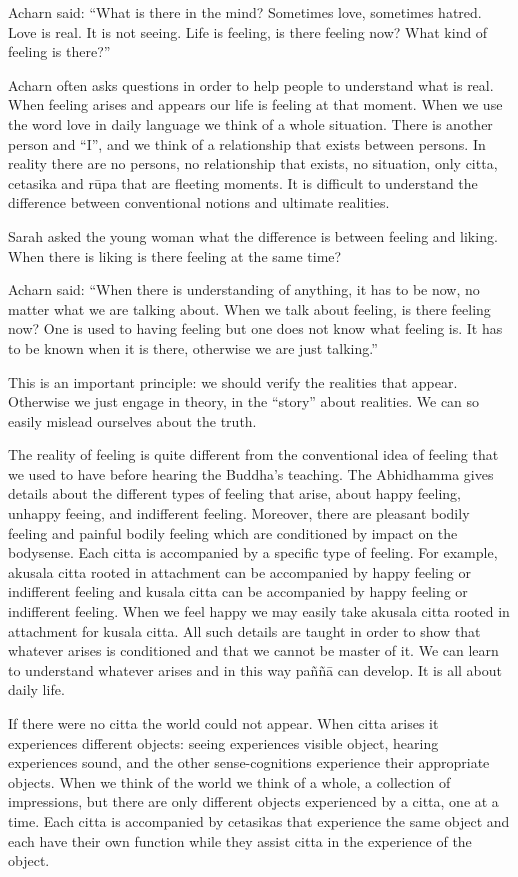 \documentclass{book}
\begin{document}
Acharn said: ``What is there in the mind? Sometimes love,
sometimes hatred. Love is real. It is not seeing. Life is feeling, is
there feeling now? What kind of feeling is there?'' 

Acharn often asks questions in order to help people to
understand what is real. When feeling arises and appears our life is
feeling at that moment. When we use the word love in daily language we
think of a whole situation. There is another person and ``I'', and we
think of a relationship that exists between persons. In reality there
are no persons, no relationship that exists, no situation, only citta,
cetasika and rūpa that are fleeting moments. It is difficult to
understand the difference between conventional notions and ultimate
realities.

Sarah asked the young woman what the difference is between
feeling and liking. When there is liking is there feeling at the same
time?

Acharn said: ``When there is understanding of anything, it
has to be now, no matter what we are talking about. When we talk about
feeling, is there feeling now? One is used to having feeling but one
does not know what feeling is. It has to be known when it is there,
otherwise we are just talking.'' 

This is an important principle: we should verify the
realities that appear. Otherwise we just engage in theory, in the
``story'' about realities. We can so easily mislead ourselves about the
truth. 

The reality of feeling is quite different
from the conventional idea of feeling that we used to have before
hearing the Buddha's teaching. The
Abhidhamma gives details about the different types of
feeling that arise,
about happy feeling, unhappy feeing, and indifferent
feeling. Moreover, there are pleasant bodily feeling and painful bodily
feeling which are conditioned by impact on the bodysense. Each citta is
accompanied by a specific type of feeling. For example, akusala citta
rooted in attachment can be accompanied by happy feeling or indifferent
feeling and kusala citta can be accompanied by happy feeling or
indifferent feeling. When we feel
happy we may easily take akusala citta rooted in attachment
for kusala citta. All such details are taught in order to show that
whatever arises is conditioned and that
we cannot be master of it. We can learn to understand whatever arises
and in this way paññā can
develop. It is all about daily life. 

If there were no citta the world could not
appear. When citta arises it experiences different objects: seeing
experiences visible object, hearing experiences sound, and the other
sense-cognitions experience their appropriate objects. When we think of
the world we think of a whole, a collection of impressions, but there
are only different objects experienced by a citta, one at a time. Each
citta is accompanied by cetasikas that experience the same object and
each have their own function while they assist citta in the experience
of the object. 
\end{document}
